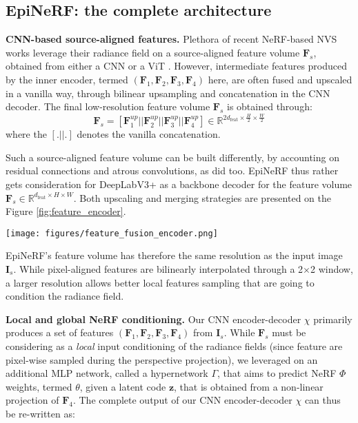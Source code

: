 \subsection{EpiNeRF: the complete architecture}
\label{subsec:epinerf}
\noindent\textbf{CNN-based source-aligned features.} Plethora of recent NeRF-based NVS works leverage their radiance field on a source-aligned feature volume $\mathbf{F}_{s}$, obtained from either a CNN \cite{codenerf,pixelnerf,symmnerf} or a ViT \cite{visionnerf}. However, intermediate features produced by the inner encoder, termed $(\mathbf{F}_{1},\mathbf{F}_{2},\mathbf{F}_{3},\mathbf{F}_{4})$ here,  are often fused and upscaled in a vanilla way, through bilinear upsampling and concatenation in the CNN decoder. The final low-resolution feature volume $\mathbf{F}_{s}$ is obtained through: 
\begin{equation}
    \mathbf{F}_{s} = \left[\mathbf{F}_{1}^{up} || \mathbf{F}_{2}^{up} || \mathbf{F}_{3}^{up} || \mathbf{F}_{4}^{up}\right] \in \mathbb{R}^{2d_{\text{feat}} \times \frac{H}{2} \times \frac{W}{2}}
\end{equation}
where the $[.||.]$ denotes the vanilla concatenation. 

Such a source-aligned feature volume can be built differently, by accounting on residual connections and atrous convolutions, as \cite{chan2023generative} did too. 
EpiNeRF thus rather gets consideration for DeepLabV3+ \cite{deeplabv3plus} as a backbone decoder for the feature volume $\textbf{F}_{s}\in \mathbb{R}^{d_{\text{feat}} \times H \times W}$.  Both upscaling and merging strategies are presented on the Figure \ref{fig:feature_encoder}. 

\begin{figure*}[htb!]
    \center
  \texttt{[image: figures/feature\_fusion\_encoder.png]}
  \caption{Overview of the CNN decoder $\chi$ involved in SymmNeRF (left) and in our configuration by leveraging on DeepLabV3+ (right). One might note that $\chi$ in both case leverages a ResNet34-based encoder \cite{he2016deep}. }
  \label{fig:feature_encoder}
\end{figure*}
EpiNeRF's feature volume has therefore the same resolution as the input image $\mathbf{I}_s$. While pixel-aligned features are bilinearly interpolated through a 2$\times$2 window, a larger resolution allows better local features sampling that are going to condition the radiance field. \newline

\noindent\textbf{Local and global NeRF conditioning.} Our CNN encoder-decoder $\chi$ primarily produces a set of features $(\mathbf{F}_{1},\mathbf{F}_{2},\mathbf{F}_{3},\mathbf{F}_{4})$ from $\textbf{I}_{s}$. While $\mathbf{F}_{s}$ must be considering as a \textit{local} input conditioning of the radiance fields (since feature are pixel-wise sampled during the perspective projection), we leveraged on an additional MLP network, called a hypernetwork $\Gamma$, that aims to predict NeRF $\Phi$ weights, termed $\theta$, given a latent code $\mathbf{z}$, that is obtained from a non-linear projection of $\mathbf{F}_{4}$. The complete output of our CNN encoder-decoder $\chi$ can thus be re-written as:

